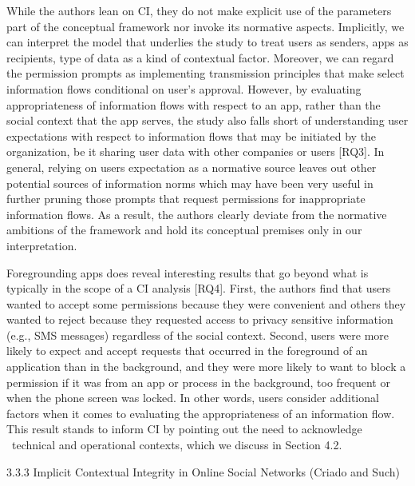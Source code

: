 \documentclass[../thesis.tex]{subfiles}
\begin{document}
While the authors lean on CI, they do not make explicit use of the
parameters part of the conceptual framework nor invoke its normative
aspects. Implicitly, we can interpret the model that underlies the
study to treat users as senders, apps as recipients, type of data as a
kind of contextual factor. Moreover, we can regard the permission
prompts as implementing transmission principles that make select
information flows conditional on user's approval.
However, by evaluating appropriateness of information flows with
respect to an app, rather than the social context that the app serves,
the study also falls short of understanding user expectations with
respect to information flows that may be initiated by the organization,
be it sharing user data with other companies or users [RQ3]. In
general, relying on users expectation as a normative source leaves out
other potential sources of information norms which may have been very
useful in further pruning those prompts that request permissions for
inappropriate information flows. As a result, the authors clearly
deviate from the normative ambitions of the framework and hold its
conceptual premises only in our interpretation.

\textcolor[rgb]{0.2,0.2,0.2}{Foregrounding apps does reveal interesting
results that go beyond what is typically in the scope of a CI analysis
[RQ4]. First, the authors find that users wanted to accept some
permissions because they were convenient and others they wanted to
reject because they requested access to privacy sensitive information
(e.g., SMS messages) regardless of the social context. Second, users
were more likely to expect and accept requests that occurred in the
foreground of an application than in the background, and they were more
likely to want to block a permission if it was from an app or process
in the background, too frequent or when the phone screen was locked. In
other words, users consider additional factors when it comes to
evaluating the appropriateness of an information flow. This result
stands to inform CI by pointing out the need to acknowledge \ technical
and operational contexts, which we discuss in Section 4.2.}


\bigskip

{\color[rgb]{0.2627451,0.2627451,0.2627451}
3.3.3 Implicit Contextual Integrity in Online Social Networks (Criado
and Such)}
\end{document}
